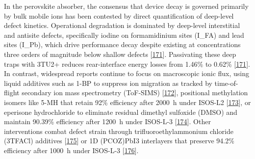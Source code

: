 \documentclass[
  11pt,
]{article}
\begin{document}
In the perovskite absorber, the consensus that device decay is governed
primarily by bulk mobile ions has been contested by direct
quantification of deep-level defect kinetics. Operational degradation is
dominated by deep-level interstitial and antisite defects, specifically
iodine on formamidinium sites (I\_FA) and lead sites (I\_Pb), which
drive performance decay despite existing at concentrations three orders
of magnitude below shallow defects
{[}\href{https://doi.org/10.1002/adma.73679}{171}{]}. Passivating these
deep traps with 3TU2+ reduces rear-interface energy losses from 1.46\%
to 0.62\% {[}\href{https://doi.org/10.1002/adma.73679}{171}{]}. In
contrast, widespread reports continue to focus on macroscopic ionic
flux, using liquid additives such as 1-BP to suppress ion migration as
tracked by time-of-flight secondary ion mass spectrometry (ToF-SIMS)
{[}\href{https://doi.org/10.1038/s41467-025-68231-0}{172}{]}, positional
methylation isomers like 5-MH that retain 92\% efficiency after
\qty{2000}{\hour} under ISOS-L2
{[}\href{https://doi.org/10.1002/adma.202520432}{173}{]}, or eperisone
hydrochloride to eliminate residual dimethyl sulfoxide (DMSO) and
maintain 90.39\% efficiency after \qty{1200}{\hour} under ISOS-L-3
{[}\href{https://doi.org/10.1021/acsenergylett.5c03999}{174}{]}. Other
interventions combat defect strain through trifluoroethylammonium
chloride (3TFACl) additives
{[}\href{https://doi.org/10.1002/adfm.76756}{175}{]} or 1D (PCOZ)PbI3
interlayers that preserve 94.2\% efficiency after \qty{1000}{\hour}
under ISOS-L-3 {[}\href{https://doi.org/10.1002/adma.73161}{176}{]}.
\end{document}
